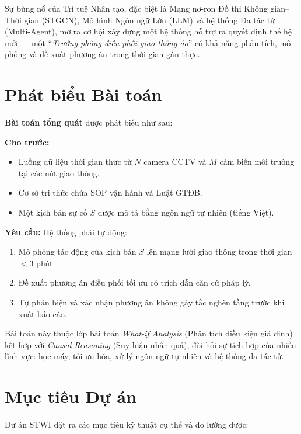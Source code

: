 Sự bùng nổ của Trí tuệ Nhân tạo, đặc biệt là Mạng nơ-ron Đồ thị Không gian--Thời gian (STGCN), Mô hình Ngôn ngữ Lớn (LLM) và hệ thống Đa tác tử (Multi-Agent), mở ra cơ hội xây dựng một hệ thống hỗ trợ ra quyết định thế hệ mới --- một ``\textit{Trưởng phòng điều phối giao thông ảo}'' có khả năng phân tích, mô phỏng và đề xuất phương án trong thời gian gần thực.

\section{Phát biểu Bài toán}

\textbf{Bài toán tổng quát} được phát biểu như sau:

\begin{tcolorbox}[notebox]
\textbf{Cho trước:}
\begin{itemize}[itemsep=2pt]
  \item Luồng dữ liệu thời gian thực từ $N$ camera CCTV và $M$ cảm biến môi trường tại các nút giao thông.
  \item Cơ sở tri thức chứa SOP vận hành và Luật GTĐB.
  \item Một kịch bản sự cố $S$ được mô tả bằng ngôn ngữ tự nhiên (tiếng Việt).
\end{itemize}

\textbf{Yêu cầu:} Hệ thống phải tự động:
\begin{enumerate}[itemsep=2pt]
  \item Mô phỏng tác động của kịch bản $S$ lên mạng lưới giao thông trong thời gian $< 3$ phút.
  \item Đề xuất phương án điều phối tối ưu có trích dẫn căn cứ pháp lý.
  \item Tự phản biện và xác nhận phương án không gây tắc nghẽn tầng trước khi xuất báo cáo.
\end{enumerate}
\end{tcolorbox}

Bài toán này thuộc lớp bài toán \textit{What-if Analysis} (Phân tích điều kiện giả định) kết hợp với \textit{Causal Reasoning} (Suy luận nhân quả), đòi hỏi sự tích hợp của nhiều lĩnh vực: học máy, tối ưu hóa, xử lý ngôn ngữ tự nhiên và hệ thống đa tác tử.

\section{Mục tiêu Dự án}

Dự án STWI đặt ra các mục tiêu kỹ thuật cụ thể và đo lường được:

